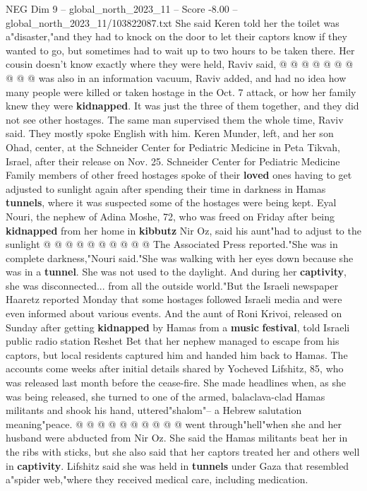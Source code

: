 \begin{textsample}{NEG Dim 9 – global\_north\_2023\_11 – Score -8.00 – global\_north\_2023\_11/103822087.txt}
She said Keren told her the toilet was a"disaster,"and they had to knock on the door to let their captors know if they wanted to go, but sometimes had to wait up to two hours to be taken there.
Her cousin doesn't know exactly where they were held, Raviv said, @ @ @ @ @ @ @ @ @ @ was also in an information vacuum, Raviv added, and had no idea how many people were killed or taken hostage in the Oct. 7 attack, or how her family knew they were \textbf{kidnapped}.
It was just the three of them together, and they did not see other hostages.
The same man supervised them the whole time, Raviv said.
They mostly spoke English with him.
Keren Munder, left, and her son Ohad, center, at the Schneider Center for Pediatric Medicine in Peta Tikvah, Israel, after their release on Nov. 25.
Schneider Center for Pediatric Medicine Family members of other freed hostages spoke of their \textbf{loved} ones having to get adjusted to sunlight again after spending their time in darkness in Hamas \textbf{tunnels}, where it was suspected some of the hostages were being kept.
Eyal Nouri, the nephew of Adina Moshe, 72, who was freed on Friday after being \textbf{kidnapped} from her home in \textbf{kibbutz} Nir Oz, said his aunt"had to adjust to the sunlight @ @ @ @ @ @ @ @ @ @ The Associated Press reported."She was in complete darkness,"Nouri said."She was walking with her eyes down because she was in a \textbf{tunnel}.
She was not used to the daylight.
And during her \textbf{captivity}, she was disconnected... from all the outside world."But the Israeli newspaper Haaretz reported Monday that some hostages followed Israeli media and were even informed about various events.
And the aunt of Roni Krivoi, released on Sunday after getting \textbf{kidnapped} by Hamas from a \textbf{music} \textbf{festival}, told Israeli public radio station Reshet Bet that her nephew managed to escape from his captors, but local residents captured him and handed him back to Hamas.
The accounts come weeks after initial details shared by Yocheved Lifshitz, 85, who was released last month before the cease-fire.
She made headlines when, as she was being released, she turned to one of the armed, balaclava-clad Hamas militants and shook his hand, uttered"shalom"-- a Hebrew salutation meaning"peace. @ @ @ @ @ @ @ @ @ @ went through"hell"when she and her husband were abducted from Nir Oz.
She said the Hamas militants beat her in the ribs with sticks, but she also said that her captors treated her and others well in \textbf{captivity}.
Lifshitz said she was held in \textbf{tunnels} under Gaza that resembled a"spider web,"where they received medical care, including medication.

\end{textsample}
